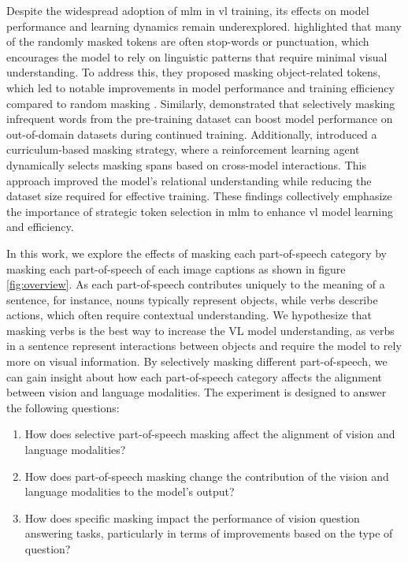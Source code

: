 Despite the widespread adoption of \acrshort{mlm} in \acrshort{vl} training, its effects on model performance and learning dynamics remain underexplored.
 highlighted that many of the randomly masked tokens are often stop-words or punctuation, which encourages the model to rely on linguistic patterns that require minimal visual understanding.
To address this, they proposed masking object-related tokens, which led to notable improvements in model performance and training efficiency compared to random masking \cite{mask_object}.
Similarly,  demonstrated that selectively masking infrequent words from the pre-training dataset can boost model performance on out-of-domain datasets during continued training.
Additionally,  introduced a curriculum-based masking strategy, where a reinforcement learning agent dynamically selects masking spans based on cross-model interactions. This approach improved the model's relational understanding while reducing the dataset size required for effective training.
These findings collectively emphasize the importance of strategic token selection in \acrshort{mlm} to enhance \acrshort{vl} model learning and efficiency.

In this work, we explore the effects of masking each part-of-speech category by masking each part-of-speech of each image captions as shown in figure \ref{fig:overview}. 
As each part-of-speech contributes uniquely to the meaning of a sentence, for instance, nouns typically represent objects, while verbs describe actions, which often require contextual understanding. 
We hypothesize that masking verbs is the best way to increase the VL model understanding, as verbs in a sentence represent interactions between objects and require the model to rely more on visual information.
By selectively masking different part-of-speech, we can gain insight about how each part-of-speech category affects the alignment between vision and language modalities. 
The experiment is designed to answer the following questions:
\begin{enumerate}
    \item How does selective part-of-speech masking affect the alignment of vision and language modalities?
    \item How does part-of-speech masking change the contribution of the vision and language modalities to the model's output?
    \item How does specific masking impact the performance of vision question answering tasks, particularly in terms of improvements based on the type of question?
\end{enumerate}

